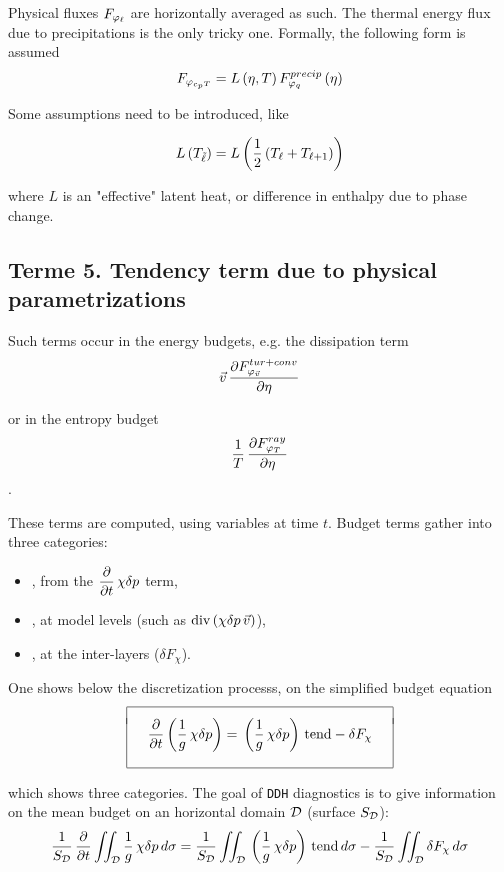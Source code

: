 Physical fluxes $\ds F_{\varphi_\ell}$ are horizontally averaged as such. The thermal energy flux due to precipitations is the only tricky one. Formally, the following form is assumed
$$ F_{\vp_{c_p T}} = L \lp \eta, T \rp F_{\vp_q}^{precip} \lp \eta \rp $$

\noi Some assumptions need to be introduced, like 
 
$$ L \lp T_{\tilde\ell} \rp = L \lp \frac 12\lp T_{\ell} + T_{\ell+1} \rp \rp $$

\noi where $L$ is an "effective" latent heat, or difference in enthalpy due to phase change.

\subsection{Terme 5. Tendency term due to physical parametrizations}

Such terms occur in the energy budgets, e.g. the dissipation term
$$ \vec v \,\DerP{F_{\vp_{\vec v}}^{tur+conv}}{\eta} $$

\noi or in the entropy budget
$$ \frac 1T \,\DerP{F_{\vp_T}^{ray}}{\eta} $$.

\noi These terms are computed, using variables at time $t$.
\bigskip
Budget terms gather into three categories:
\begin{itemize}
\item {}, from the $\ds \DerP{}t \,\chi\delta p$ term,
\item {}, at model levels (such as $\div \lp \chi \delta p \,\vec v \rp$),
\item {}, at the inter-layers ($\delta F_\chi$).
\end{itemize}

One shows below the discretization processs, on the simplified budget equation 
$$ \bay{|c|} \hline \\[-1ex]
\quad \ds \DerP{}t \lp \frac 1g \,\chi\delta p \rp 
= \,\lp \frac 1g \,\chi\delta p \rp \, {\rm tend }
- \delta F_\chi \quad \\[4ex] \hline \eay $$

\noi which shows three categories. The goal of {\tt DDH} diagnostics is to give information on the mean budget on an horizontal domain $\cal D$ (surface $S_{\cal D}$): 
$$ \frac 1{S_{\cal D}} \, \DerP{}t \iint_{\cal D} \frac 1g \,\chi\delta p \,d\sigma = \frac 1{S_{\cal 
D}} \iint_{\cal D} \,\lp \frac 1g \,\chi\delta p \rp \,  {\rm tend } \, d\sigma - \frac 1{S_{\cal D}} \iint_{\cal 
D} \delta F_\chi \,d\sigma $$

